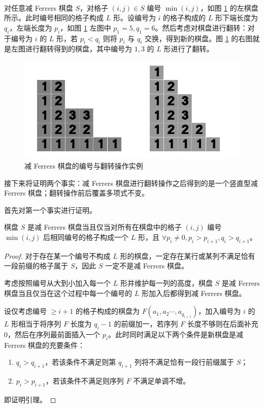 \documentclass{noithesis}
\begin{document}
	~\\
	
	对任意减 Ferrers 棋盘 $S$，对格子 $(i,j) \in S$ 编号 $\min(i,j)$，如图 \ref{f13} 的左棋盘所示。此时编号相同的格子构成 $L$ 形。设编号为 $i$ 的格子构成的 $L$ 形下端长度为 $q_i$，左端长度为 $p_i$，如图 \ref{f13} 左图中 $p_1=5,q_1=6$。然后考虑对棋盘进行翻转：对于编号为 $i$ 的 $L$ 形，若 $p_i < q_i$ 则将 $p_i$ 与 $q_i$ 交换，得到新的棋盘。图 \ref{f13} 的右图就是左图进行翻转得到的棋盘，其中编号为 $1,3$ 的 $L$ 形进行了翻转。
	
	\begin{figure}[h]
		\centering
		\caption{减 Ferrers 棋盘的编号与翻转操作实例}
		\label{f13}
		\includegraphics[scale=0.4]{picture/figure13.png}
	\end{figure}
	
	接下来将证明两个事实：减 Ferrers 棋盘进行翻转操作之后得到的是一个竖直型减 Ferrers 棋盘；翻转操作前后覆盖多项式不变。

	首先对第一个事实进行证明。
	
	\begin{lemma}
		棋盘 $S$ 是减 Ferrers 棋盘当且仅当对所有在棋盘中的格子 $(i,j)$ 编号 $\min(i,j)$ 后相同编号的格子构成一个 $L$ 形，且 $\forall p_i \neq 0 , p_i > p_{i+1},q_i > q_{i+1}$。
	\end{lemma}
	\begin{proof}
		对于存在某一个编号不构成 $L$ 形的棋盘，一定存在某行或某列不满足恰有一段前缀的格子属于 $S$，因此 $S$ 一定不是减 Ferrers 棋盘。
		
		考虑按照编号从大到小加入每一个 $L$ 形并维护每一列的高度，棋盘 $S$ 是减 Ferrers 棋盘当且仅当在这个过程中每一个编号的 $L$ 形加入后都得到减 Ferrers 棋盘。
		
		设仅考虑编号 $\geq i+1$ 的格子构成的棋盘为 $F(a_1,a_2\cdots,a_{q_{i+1}})$，加入编号为 $i$ 的 $L$ 形相当于将序列 $F$ 长度为 $q_i-1$ 的前缀加一，若序列 $F$ 长度不够则在后面补充 $0$，然后在序列最前面插入一个 $p_i$。此时同时满足以下两个条件是新棋盘是减 Ferrers 棋盘的充要条件：
		\begin{enumerate}
			\item $q_i > q_{i+1}$，若该条件不满足则第 $q_{i+1}$ 列将不满足恰有一段行前缀属于 $S$；
			\item $p_i > p_{i+1}$，若该条件不满足则序列 $F$ 不满足单调不增。
		\end{enumerate}
		即证明引理。
	\end{proof}
	
\end{document}
